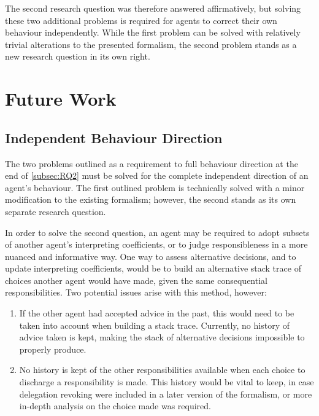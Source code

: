 The second research question was therefore answered affirmatively, but solving these two additional problems is required for agents to correct their own behaviour independently. While the first problem can be solved with relatively trivial alterations to the presented formalism, the second problem stands as a new research question in its own right.\par

\section{Future Work}\label{sec:future_work}

\subsection{Independent Behaviour Direction}
The two problems outlined as a requirement to full behaviour direction at the end of \cref{subsec:RQ2} must be solved for the complete independent direction of an agent's behaviour. The first outlined problem is technically solved with a minor modification to the existing formalism; however, the second stands as its own separate research question.\par

In order to solve the second question, an agent may be required to adopt subsets of another agent's interpreting coefficients, or to judge responsibleness in a more nuanced and informative way. One way to assess alternative decisions, and to update interpreting coefficients, would be to build an alternative stack trace of choices another agent would have made, given the same consequential responsibilities. Two potential issues arise with this method, however:

\begin{enumerate}
    \item If the other agent had accepted advice in the past, this would need to be taken into account when building a stack trace. Currently, no history of advice taken is kept, making the stack of alternative decisions impossible to properly produce.\par
    \item No history is kept of the other responsibilities available when each choice to discharge a responsibility is made. This history would be vital to keep, in case delegation revoking were included in a later version of the formalism, or more in-depth analysis on the choice made was required.\par
\end{enumerate}


